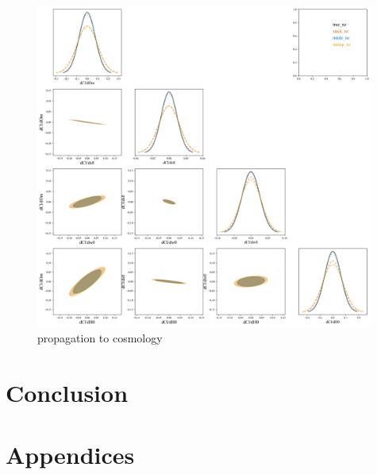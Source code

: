 \documentclass[iop]{emulateapj}
\begin{document}
\begin{figure}
	\begin{center}
		\includegraphics[width=0.99\textwidth]{fig/final_plot.png}
		\caption{propagation to cosmology}
		\label{fig:cornerplot}
	\end{center}
\end{figure}

\section{Conclusion}
\label{sec:conclusion}

\section*{Appendices}
\end{document}
